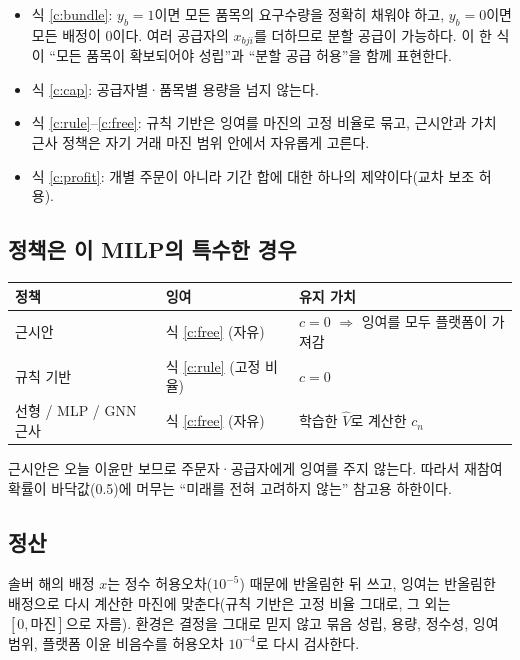\documentclass[11pt,a4paper]{article}
\begin{document}
\begin{itemize}[leftmargin=1.5em]
  \item 식 \eqref{c:bundle}: $y_b=1$이면 모든 품목의 요구수량을 정확히 채워야 하고,
        $y_b=0$이면 모든 배정이 0이다. 여러 공급자의 $x_{bji}$를 더하므로 분할 공급이 가능하다.
        이 한 식이 ``모든 품목이 확보되어야 성립''과 ``분할 공급 허용''을 함께 표현한다.
  \item 식 \eqref{c:cap}: 공급자별·품목별 용량을 넘지 않는다.
  \item 식 \eqref{c:rule}--\eqref{c:free}: 규칙 기반은 잉여를 마진의 고정 비율로 묶고,
        근시안과 가치 근사 정책은 자기 거래 마진 범위 안에서 자유롭게 고른다.
  \item 식 \eqref{c:profit}: 개별 주문이 아니라 기간 합에 대한 하나의 제약이다(교차 보조 허용).
\end{itemize}

\subsection{정책은 이 MILP의 특수한 경우}\label{sec:policies}

\begin{table}[H]
\centering\small
\begin{tabularx}{\linewidth}{lYY}
\toprule
정책 & 잉여 & 유지 가치\\
\midrule
근시안 & 식 \eqref{c:free} (자유) & $c=0$ $\Rightarrow$ 잉여를 모두 플랫폼이 가져감\\
규칙 기반 & 식 \eqref{c:rule} (고정 비율) & $c=0$\\
선형 / MLP / GNN 근사 & 식 \eqref{c:free} (자유) & 학습한 $\hat V$로 계산한 $c_n$\\
\bottomrule
\end{tabularx}
\end{table}

근시안은 오늘 이윤만 보므로 주문자·공급자에게 잉여를 주지 않는다.
따라서 재참여 확률이 바닥값(0.5)에 머무는 ``미래를 전혀 고려하지 않는'' 참고용 하한이다.

\subsection{정산}

솔버 해의 배정 $x$는 정수 허용오차($10^{-5}$) 때문에 반올림한 뒤 쓰고,
잉여는 반올림한 배정으로 다시 계산한 마진에 맞춘다(규칙 기반은 고정 비율 그대로,
그 외는 $[0,\text{마진}]$으로 자름). 환경은 결정을 그대로 믿지 않고 묶음 성립, 용량,
정수성, 잉여 범위, 플랫폼 이윤 비음수를 허용오차 $10^{-4}$로 다시 검사한다.
\end{document}

